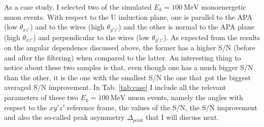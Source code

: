 As a case study, I selected two of the simulated $E_{k} = 100 \ \mathrm{MeV}$ monoenergetic muon events. With respect to the U induction plane, one is parallel to the APA (low $\theta_{xz'}$) and to the wires (high $\theta_{y'z'}$) and the other is normal to the APA plane (high $\theta_{xz'}$) and perpendicular to the wires (low $\theta_{y'z'}$). As expected from the results on the angular dependence discussed above, the former has a higher S/N (before and after the filtering) when compared to the latter. An interesting thing to notice about these two samples is that, even though one has a much bigger S/N than the other, it is the one with the smallest S/N the one that got the biggest averaged S/N improvement. In Tab. \ref{tab:case} I include all the relevant parameters of these two $E_{k} = 100 \ \mathrm{MeV}$ muon events, namely the angles with respect to the $xy'z'$ reference frame, the values of the S/N, the S/N improvement and also the so-called peak asymmetry $\Delta_{peak}$ that I will discuss next.

